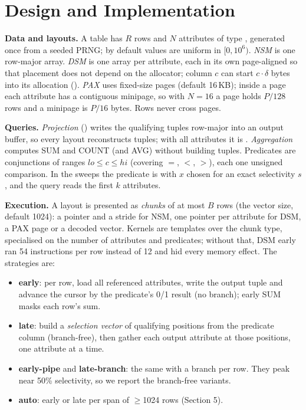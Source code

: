 \section{Design and Implementation}
\textbf{Data and layouts.} A table has $R$ rows and $N$ attributes of type ,
generated once from a seeded PRNG; by default values are uniform in $[0, 10^6)$. \emph{NSM} is
one row-major array. \emph{DSM} is one array per attribute, each in its own page-aligned
 so that placement does not depend on the allocator; column $c$ can start
$c\cdot\delta$ bytes into its allocation (). \emph{PAX} uses fixed-size
pages (default 16\,KB); inside a page each attribute has a contiguous minipage, so with $N{=}16$
a page holds $P/128$ rows and a minipage is $P/16$ bytes. Rows never cross pages.

\textbf{Queries.} \emph{Projection} () writes the
qualifying tuples row-major into an output buffer, so every layout reconstructs tuples; with
all attributes it is . \emph{Aggregation} computes SUM and COUNT (and AVG)
without building tuples. Predicates are conjunctions of ranges $\mathit{lo} \le c \le
\mathit{hi}$ (covering $=$, $<$, $>$), each one unsigned comparison. In the sweeps the predicate
is  with $x$ chosen for an exact selectivity $s$, and the query reads the first $k$
attributes.

\textbf{Execution.} A layout is presented as \emph{chunks} of at most $B$ rows (the vector size,
default 1024): a pointer and a stride for NSM, one pointer per attribute for DSM, a PAX page or
a decoded vector. Kernels are templates over the chunk type, specialised on the number of
attributes and predicates; without that, DSM early ran 54 instructions per row instead of 12
and hid every memory effect. The strategies are:
\begin{itemize}
  \item \textbf{early}: per row, load all referenced attributes, write the output tuple and
  advance the cursor by the predicate's 0/1 result (no branch); early SUM masks each row's sum.
  \item \textbf{late}: build a \emph{selection vector} of qualifying positions from the
  predicate column (branch-free), then gather each output attribute at those positions, one
  attribute at a time.
  \item \textbf{early-pipe} and \textbf{late-branch}: the same with a branch per row. They peak
  near 50\% selectivity, so we report the branch-free variants.
  \item \textbf{auto}: early or late per span of $\geq$1024 rows (Section 5).
\end{itemize}

